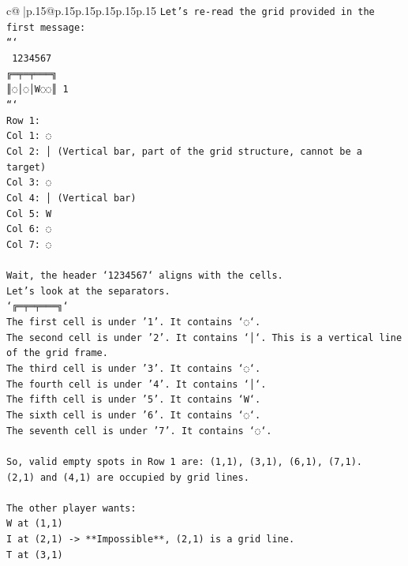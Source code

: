 \documentclass{article}
\begin{document}
{\begin{supertabular}{c@{$\;$}|p{.15\linewidth}@{}p{.15\linewidth}p{.15\linewidth}p{.15\linewidth}p{.15\linewidth}p{.15\linewidth}}
{{{\texttt{Let's re{-}read the grid provided in the first message:} \\
\texttt{```} \\
\texttt{ 1234567} \\
\texttt{╔═╤═╤═══╗} \\
\texttt{║◌│◌│W◌◌║ 1} \\
\texttt{```} \\
\texttt{Row 1:} \\
\texttt{Col 1: ◌} \\
\texttt{Col 2: │ (Vertical bar, part of the grid structure, cannot be a target)} \\
\texttt{Col 3: ◌} \\
\texttt{Col 4: │ (Vertical bar)} \\
\texttt{Col 5: W} \\
\texttt{Col 6: ◌} \\
\texttt{Col 7: ◌} \\
\\ 
\texttt{Wait, the header `1234567` aligns with the cells.} \\
\texttt{Let's look at the separators.} \\
\texttt{`╔═╤═╤═══╗`} \\
\texttt{The first cell is under '1'. It contains `◌`.} \\
\texttt{The second cell is under '2'. It contains `│`. This is a vertical line of the grid frame.} \\
\texttt{The third cell is under '3'. It contains `◌`.} \\
\texttt{The fourth cell is under '4'. It contains `│`.} \\
\texttt{The fifth cell is under '5'. It contains `W`.} \\
\texttt{The sixth cell is under '6'. It contains `◌`.} \\
\texttt{The seventh cell is under '7'. It contains `◌`.} \\
\\ 
\texttt{So, valid empty spots in Row 1 are: (1,1), (3,1), (6,1), (7,1).} \\
\texttt{(2,1) and (4,1) are occupied by grid lines.} \\
\\ 
\texttt{The other player wants:} \\
\texttt{W at (1,1)} \\
\texttt{I at (2,1) {-}> **Impossible**, (2,1) is a grid line.} \\
\texttt{T at (3,1)} \\
}}}
\end{supertabular}}
\end{document}
